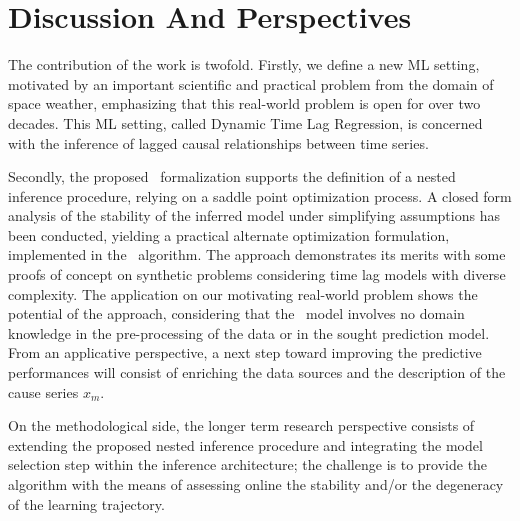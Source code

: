 \section{Discussion And Perspectives}
The contribution of the work is twofold. Firstly, we define a new ML setting, motivated by an 
important scientific and practical problem from the domain of space weather, emphasizing that this 
real-world problem is open for over two decades. This ML setting, called 
Dynamic Time Lag Regression, is concerned with the inference of lagged causal relationships between 
time series. 

Secondly, the proposed \XX\ formalization supports the definition of a nested inference procedure, 
relying on a saddle point optimization process. A closed form analysis of the stability of the 
inferred model under simplifying assumptions has been conducted, yielding a practical alternate 
optimization formulation, implemented in the \XX\ algorithm. The approach demonstrates its merits 
with some proofs of concept on synthetic problems considering time lag models with diverse 
complexity. The application on our motivating real-world problem shows the potential of the 
approach, considering that the \XX\ model involves no domain knowledge in the pre-processing of the 
data or in the sought prediction model. From an applicative perspective, a next step toward 
improving the predictive performances will consist of enriching the data sources and the 
description of the cause series $x_m$.

On the methodological side, the longer term research perspective consists of extending the proposed 
nested inference procedure and integrating the model selection step within the inference 
architecture; the challenge is to provide the algorithm with the means of assessing online the 
stability and/or the degeneracy of the learning trajectory. 



%
%
